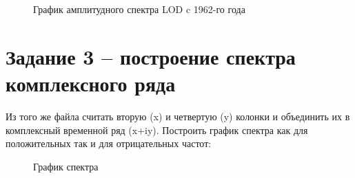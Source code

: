 \documentclass[a4paper,oneside,14pt]{extreport}
\begin{document}
\begin{figure}[h]
	\caption{График амплитудного спектра LOD c 1962-го года}
	\label{task2_g3}
\end{figure}

\newpage
\section*{Задание 3 – построение спектра комплексного ряда}

Из того же файла считать вторую (x) и четвертую (y) колонки и объединить их в  комплексный временной ряд (x+iy). Построить график спектра как для положительных так и для отрицательных частот:

\begin{figure}[h]
	\caption{График спектра}
	\label{task3_g1}
\end{figure}
\end{document}
